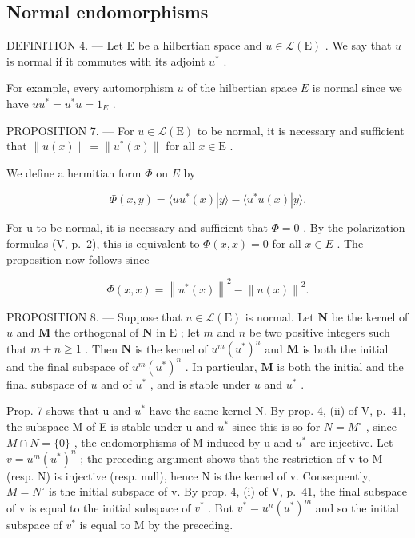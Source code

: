 \subsection{Normal endomorphisms}

DEFINITION 4. --- Let E be a hilbertian space and \(u \in \mathcal{L}(\mathrm{E})\) . We say that \(u\) is normal if it commutes with its adjoint \(u^{*}\) .

For example, every automorphism \(u\) of the hilbertian space \(E\) is normal since we have \(uu^{*} = u^{*}u = 1_{E}\) .

PROPOSITION 7. --- For \(u \in \mathcal{L}(\mathrm{E})\) to be normal, it is necessary and sufficient that \(\| u(x) \| = \| u^{*}(x) \|\) for all \(x \in \mathrm{E}\) .

We define a hermitian form \(\Phi\) on \(E\) by

\[
\Phi (x, y) = \langle u u ^ {*} (x) | y \rangle - \langle u ^ {*} u (x) | y \rangle .
\]

For u to be normal, it is necessary and sufficient that \(\Phi = 0\) . By the polarization formulas (V, p.~2), this is equivalent to \(\Phi(x, x) = 0\) for all \(x \in E\) . The proposition now follows since

\[
\Phi (x, x) = \left\| u ^ {*} (x) \right\| ^ {2} - \left\| u (x) \right\| ^ {2}.
\]

PROPOSITION 8. --- Suppose that \(u \in \mathcal{L}(\mathrm{E})\) is normal. Let \(\mathbf{N}\) be the kernel of \(u\) and \(\mathbf{M}\) the orthogonal of \(\mathbf{N}\) in \(\mathrm{E}\) ; let \(m\) and \(n\) be two positive integers such that \(m + n \geqslant 1\) . Then \(\mathbf{N}\) is the kernel of \(u^{m}(u^{*})^{n}\) and \(\mathbf{M}\) is both the initial and the final subspace of \(u^{m}(u^{*})^{n}\) . In particular, \(\mathbf{M}\) is both the initial and the final subspace of \(u\) and of \(u^{*}\) , and is stable under \(u\) and \(u^{*}\) .

Prop. 7 shows that u and \(u^{*}\) have the same kernel N. By prop. 4, (ii) of V, p.~41, the subspace M of E is stable under u and \(u^{*}\) since this is so for \(N = M^{\circ}\) , since \(M \cap N = \{0\}\) , the endomorphisms of M induced by u and \(u^{*}\) are injective. Let \(v = u^{m}(u^{*})^{n}\) ; the preceding argument shows that the restriction of v to M (resp. N) is injective (resp. null), hence N is the kernel of v. Consequently, \(M = N^{\circ}\) is the initial subspace of v. By prop. 4, (i) of V, p.~41, the final subspace of v is equal to the initial subspace of \(v^{*}\) . But \(v^{*} = u^{n}(u^{*})^{m}\) and so the initial subspace of \(v^{*}\) is equal to M by the preceding.

